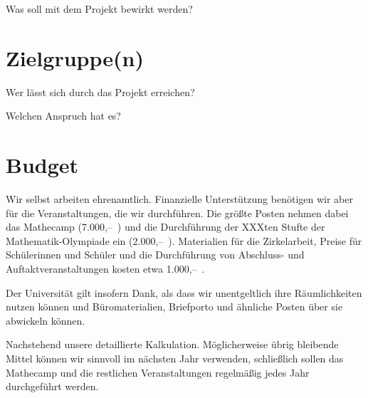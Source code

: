 \documentclass[12pt]{zettel}
\begin{document}
Was soll mit dem Projekt bewirkt werden?


\section{Zielgruppe(n)}

Wer lässt sich durch das Projekt erreichen?

Welchen Anspruch hat es?


\section{Budget}

Wir selbst arbeiten ehrenamtlich. Finanzielle Unterstützung benötigen wir aber
für die Veranstaltungen, die wir durchführen. Die größte Posten nehmen dabei das
Mathecamp (7.000,--~\texteuro) und die Durchführung der XXXten Stufte der
Mathematik-Olympiade ein (2.000,--~\texteuro). Materialien für die
Zirkelarbeit, Preise für Schülerinnen und Schüler und die Durchführung von
Abschluss- und Auftaktveranstaltungen kosten etwa 1.000,--~\texteuro.

Der Universität gilt insofern Dank, als dass wir unentgeltlich ihre
Räumlichkeiten nutzen können und Büromaterialien, Briefporto und ähnliche
Posten über sie abwickeln können.

Nachstehend unsere detaillierte Kalkulation. Möglicherweise übrig bleibende
Mittel können wir sinnvoll im nächsten Jahr verwenden, schließlich sollen das
Mathecamp und die restlichen Veranstaltungen regelmäßig jedes Jahr durchgeführt
werden.
\end{document}
